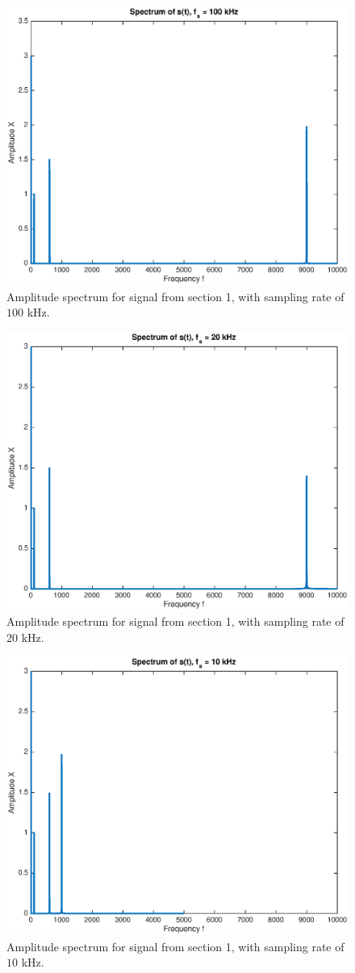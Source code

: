 \documentclass[
a4paper, 
12pt, 
]{article}
\begin{document}
\begin{figure}[h]
\centering
\includegraphics[width=0.7\linewidth]{Bilder/fs_1}
\caption{Amplitude spectrum for signal from section 1, with sampling rate of $100$ kHz.}
\label{fig:fs_1}
\end{figure}
\begin{figure}[h]
	\centering
	\includegraphics[width=0.7\linewidth]{Bilder/fs_2}
	\caption{Amplitude spectrum for signal from section 1, with sampling rate of $20$ kHz.}
	\label{fig:fs_1}
\end{figure}
\begin{figure}[h]
	\centering
	\includegraphics[width=0.7\linewidth]{Bilder/fs_3}
	\caption{Amplitude spectrum for signal from section 1, with sampling rate of $10$ kHz.}
	\label{fig:fs_1}
\end{figure}
\clearpage
\end{document}

